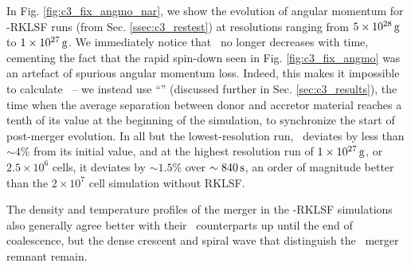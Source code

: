 
In Fig. \ref{fig:c3_fix_angmo_nar}, we show the evolution of angular momentum for \arepo-RKLSF runs (from Sec. \ref{ssec:c3_restest}) at resolutions ranging from $5\times10^{28}\,\mathrm{g}$ to $1\times10^{27}\,\mathrm{g}$.  We immediately notice that \Lzinner\ no longer decreases with time, cementing the fact that the rapid spin-down seen in Fig. \ref{fig:c3_fix_angmo} was an artefact of spurious angular momentum loss.  Indeed, this makes it impossible to calculate \tlm\ -- we instead use ``\tcoal'' (discussed further in Sec. \ref{sec:c3_results}), the time when the average separation between donor and accretor material reaches a tenth of its value at the beginning of the simulation, to synchronize the start of post-merger evolution.  In all but the lowest-resolution run, \Lztot\ deviates by less than $\sim4$\% from its initial value, and at the highest resolution run of $1\times10^{27}\,\mathrm{g}$, or $2.5\times10^6$ cells, it deviates by $\sim1.5$\% over $\sim840\,\mathrm{s}$, an order of magnitude better than the $2\times10^7$ cell simulation without RKLSF.

The density and temperature profiles of the merger in the \arepo-RKLSF simulations also generally agree better with their \gasoline\ counterparts up until the end of coalescence, but the dense crescent and spiral wave that distinguish the \arepo\ merger remnant remain.
